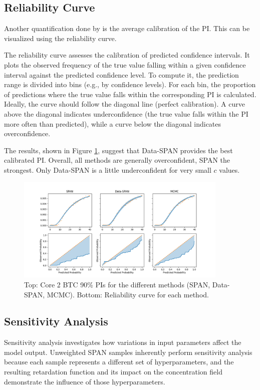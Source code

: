 \documentclass{article}
\begin{document}
\subsection{Reliability Curve}
Another quantification done by \textcite{finn} is the average calibration of the PI. This can be visualized using the reliability curve.

The reliability curve assesses the calibration of predicted confidence intervals. It plots the observed frequency of the true value falling within a given confidence interval against the predicted confidence level. To compute it, the prediction range is divided into bins (e.g., by confidence levels). For each bin, the proportion of predictions where the true value falls within the corresponding PI is calculated. Ideally, the curve should follow the diagonal line (perfect calibration). A curve above the diagonal indicates underconfidence (the true value falls within the PI more often than predicted), while a curve below the diagonal indicates overconfidence.

The results, shown in Figure \ref{fig:reliability_curves}, suggest that Data-SPAN provides the best calibrated PI. Overall, all methods are generally overconfident, SPAN the strongest. Only Data-SPAN is a little underconfident for very small $c$ values.

\begin{figure}
    \centering
    \includegraphics[width=0.9\textwidth]{figs/reliability_curves.png}
    \caption{Top: Core 2 BTC 90\% PIs for the different methods (SPAN, Data-SPAN, MCMC). Bottom: Reliability curve for each method.}
    \label{fig:reliability_curves}
\end{figure}


\subsection{Sensitivity Analysis}
\label{sec:sensitivity}
Sensitivity analysis investigates how variations in input parameters affect the model output. Unweighted SPAN samples inherently perform sensitivity analysis because each sample represents a different set of hyperparameters, and the resulting retardation function and its impact on the concentration field demonstrate the influence of those hyperparameters.
\end{document}
